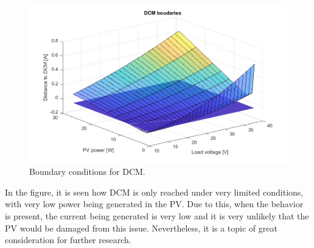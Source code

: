 \begin{figure}[H]
	\begin{center}
	\includegraphics[width=1\textwidth]{../Pictures/DistanceToDCM.png}
		\caption{Boundary conditions for DCM.}
		\label{DCM_3D}
	\end{center}	
\end{figure}

In the figure, it is seen how DCM is only reached under very limited conditions, with very low power being generated in the PV. Due to this, when the behavior is present, the current being generated is very low and it is very unlikely that the PV would be damaged from this issue. Nevertheless, it is a topic of great consideration for further research.


